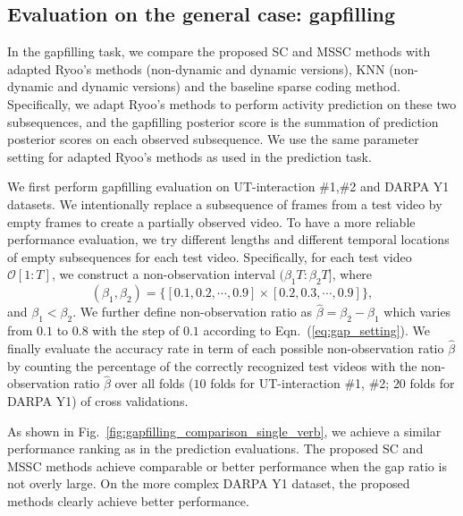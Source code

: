 \subsection{Evaluation on the general case: gapfilling}
In the gapfilling task, we compare the proposed SC and MSSC methods with
adapted Ryoo's methods (non-dynamic and dynamic versions), KNN (non-dynamic and
dynamic versions) and the baseline sparse coding method. Specifically, we adapt
Ryoo's methods to perform activity prediction on these two subsequences, and
the gapfilling posterior score is the summation of prediction posterior scores
on each observed subsequence. We use the same parameter setting for adapted
Ryoo's methods as used in the prediction task.

We first perform gapfilling evaluation on UT-interaction \#1,\#2 and DARPA Y1
datasets.  We intentionally replace a subsequence of frames from a test video
by empty frames to create a partially observed video. To have a more reliable
performance evaluation, we try different lengths and different temporal
locations of empty subsequences for each test video. Specifically, for each
test video $\mathcal{O}[1:T]$, we construct a non-observation interval
$(\beta_1T:\beta_2T]$, where
\begin{equation}
  \label{eq:gap_setting}
  (\beta_1, \beta_2) = \{[0.1, 0.2, \cdots, 0.9] \times [0.2, 0.3, \cdots, 0.9]\},
\end{equation}
and $\beta_1 < \beta_2$. We further define non-observation ratio as
$\hat{\beta} = \beta_2-\beta_1$ which varies from $0.1$ to $0.8$ with the step
of $0.1$ according to Eqn.~(\ref{eq:gap_setting}). We finally evaluate the
accuracy rate in {\color{black}term} of each possible non-observation ratio
$\hat{\beta}$ by counting the percentage of the correctly recognized test
videos with the non-observation ratio $\hat{\beta}$ over all folds ($10$ folds
for UT-interaction \#1, \#2; $20$ folds for DARPA Y1) of cross validations.

As shown in Fig.~\ref{fig:gapfilling_comparison_single_verb}, we achieve a
similar performance ranking as in the prediction evaluations. The proposed SC
and MSSC methods achieve comparable or better performance when
{\color{black}the} gap ratio is not overly large. On the more complex DARPA Y1
dataset, the proposed methods clearly achieve better performance.

